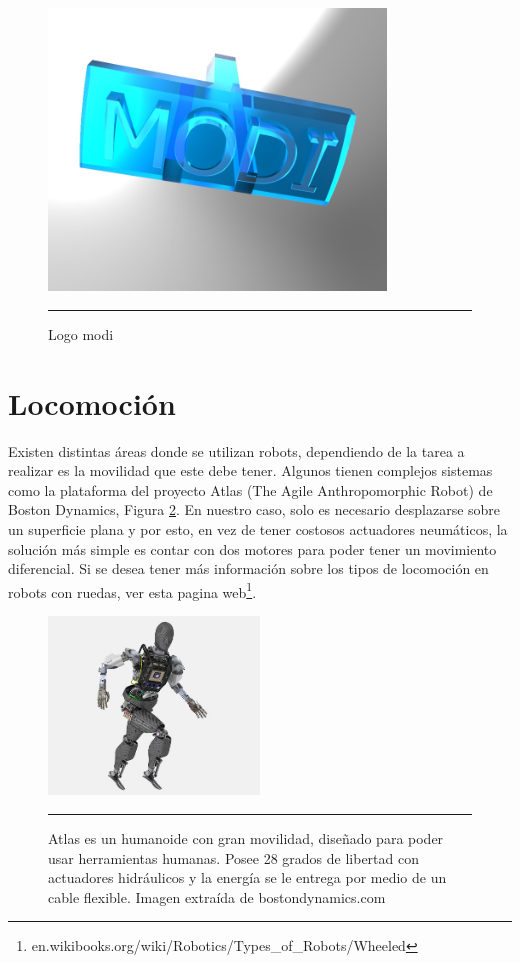 \begin{figure}[htbp]
	\centering
		\includegraphics[width=0.8\textwidth]{./Figures/MODI/logomodi.jpg}
		\rule{35em}{0.5pt}
	\caption[logomodi]{Logo modi}
	\label{fig:logomodi}
\end{figure}


\section{Locomoción}
Existen distintas áreas donde se utilizan robots, dependiendo de la tarea a realizar es la movilidad que este debe tener. Algunos tienen complejos sistemas como la plataforma del proyecto Atlas (The Agile Anthropomorphic Robot) de Boston Dynamics, Figura \ref{fig:Atlas}. En nuestro caso, solo es necesario desplazarse sobre un superficie plana y por esto, en vez de tener costosos actuadores neumáticos, la solución más simple es contar con dos motores para poder tener un movimiento diferencial. Si se desea tener más información sobre los tipos de locomoción en robots con ruedas, ver esta pagina web\footnote{en.wikibooks.org/wiki/Robotics/Types\_of\_Robots/Wheeled}.


\begin{figure}[htbp]
	\centering
		\includegraphics[width=0.5\textwidth]{./Figures/AtlasCADlr.jpg}
		\rule{35em}{0.5pt}
	\caption[Atlas]{Atlas es un humanoide con gran movilidad, diseñado para poder usar herramientas humanas. Posee 28 grados de libertad con actuadores hidráulicos y la energía se le entrega por medio de un cable flexible. Imagen extraída de bostondynamics.com }
	\label{fig:Atlas}
\end{figure}


